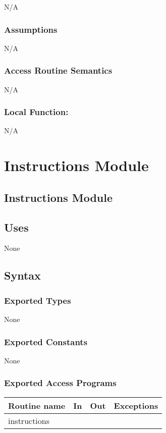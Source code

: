 \documentclass[12pt]{article}
\begin{document}
N/A

\subsubsection* {Assumptions}

N/A

\subsubsection* {Access Routine Semantics}
N/A
\subsubsection*{Local Function:}

N/A

\newpage

\section {Instructions Module}

\subsection* {Instructions Module}

\subsection* {Uses}

None

\subsection* {Syntax}

\subsubsection* {Exported Types}

None

\subsubsection* {Exported Constants}

None

\subsubsection* {Exported Access Programs}
\begin{tabular}{| l | l | l | p{6cm} |}
\hline
\textbf{Routine name} & \textbf{In} & \textbf{Out} & \textbf{Exceptions}\\
\hline
instructions & ~ & ~ &  \\
\hline
\end{tabular}
\end{document}
